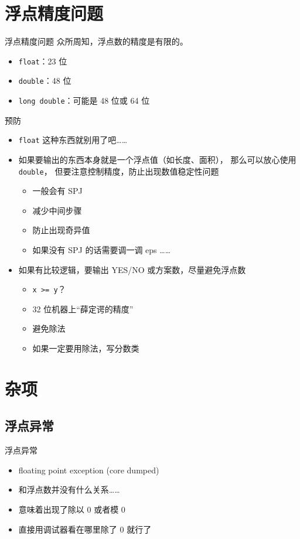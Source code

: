 \documentclass[10pt,mathserif]{beamer}%
\begin{document}
\section{浮点精度问题}
\begin{frame}{浮点精度问题}
	众所周知，浮点数的精度是有限的。
	\begin{itemize}
		\item \lstinline!float!：23 位
		\item \lstinline!double!：48 位
		\item \lstinline!long double!：可能是 48 位或 64 位
	\end{itemize}
\end{frame}

\begin{frame}{预防}
	\begin{itemize}
		\item \lstinline!float! 这种东西就别用了吧……
		\item 如果要输出的东西本身就是一个浮点值（如长度、面积），
			那么可以放心使用 \lstinline!double!，
			但要注意控制精度，防止出现数值稳定性问题
			\begin{itemize}
				\item 一般会有 SPJ
				\item 减少中间步骤
				\item 防止出现奇异值
				\item 如果没有 SPJ 的话需要调一调 eps ……
			\end{itemize}
		\item 如果有比较逻辑，要输出 YES/NO 或方案数，尽量避免浮点数
			\begin{itemize}
				\item \lstinline|x >= y|？
				\item 32 位机器上“薛定谔的精度”
				\item 避免除法
				\item 如果一定要用除法，写分数类
			\end{itemize}
	\end{itemize}
\end{frame}

\section{杂项}
\subsection{浮点异常}
\begin{frame}{浮点异常}
	\begin{itemize}
		\item floating point exception (core dumped)
		\item 和浮点数并没有什么关系……
		\item 意味着出现了除以 $0$ 或者模 $0$
		\item 直接用调试器看在哪里除了 $0$ 就行了
	\end{itemize}
\end{frame}
\end{document}
